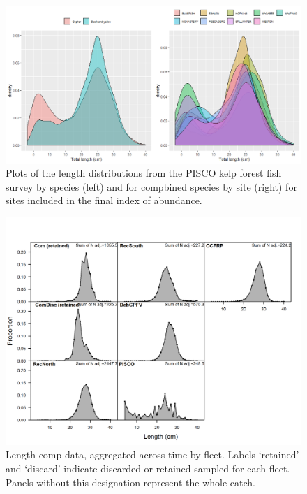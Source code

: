 \documentclass[12pt,]{article}
\begin{document}
\FloatBarrier

\begin{figure}
\centering
\includegraphics{Figures/PISCO_lengths.png}
\caption{Plots of the length distributions from the PISCO kelp forest
fish survey by species (left) and for compbined species by site (right)
for sites included in the final index of abundance.
\label{fig:PISCO_lengths}}
\end{figure}

\FloatBarrier

\begin{figure}
\centering
\includegraphics{r4ss/plots_mod1/comp_lendat__aggregated_across_time.png}
\caption{Length comp data, aggregated across time by fleet. Labels
`retained' and `discard' indicate discarded or retained sampled for each
fleet. Panels without this designation represent the whole catch.
\label{fig:comp_lendat_aggregated_across_time}}
\end{figure}
\end{document}
